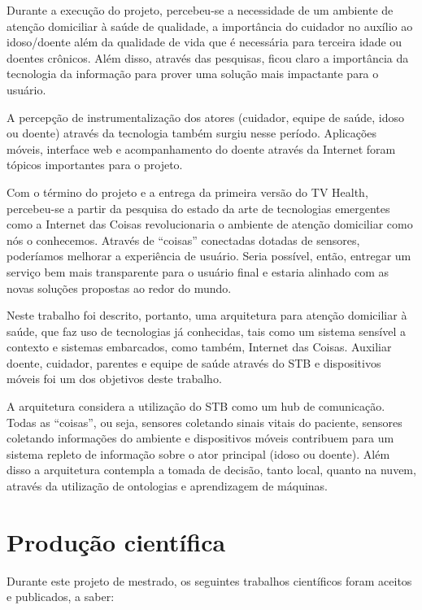 Durante a execução do projeto, percebeu-se a necessidade de um ambiente de
atenção domiciliar à saúde de qualidade, a importância do cuidador no auxílio
ao idoso/doente além da qualidade de vida que é necessária para terceira idade
ou doentes crônicos. Além disso, através das pesquisas, ficou claro a
importância da tecnologia da informação para prover uma solução mais impactante
para o usuário. 

A percepção de instrumentalização dos atores (cuidador, equipe de saúde, idoso
ou doente) através da tecnologia também surgiu nesse período. Aplicações
móveis, interface web e acompanhamento do doente através da Internet foram
tópicos importantes para o projeto.

Com o término do projeto \nextsaude[] e a entrega da primeira versão do TV Health,
percebeu-se a partir da pesquisa do estado da arte de tecnologias emergentes
como a Internet das Coisas revolucionaria o ambiente de atenção domiciliar como
nós o conhecemos. Através de ``coisas'' conectadas dotadas de sensores,
poderíamos melhorar a experiência de usuário. Seria possível, então, entregar
um serviço bem mais transparente para o usuário final e estaria alinhado com as
novas soluções propostas ao redor do mundo.

Neste trabalho foi descrito, portanto, uma arquitetura para atenção domiciliar
à saúde, que faz uso de tecnologias já conhecidas, tais como um sistema
sensível a contexto e sistemas embarcados, como também, Internet das Coisas.
Auxiliar doente, cuidador, parentes e equipe de saúde através do STB e
dispositivos móveis foi um dos objetivos deste trabalho. 

A arquitetura considera a utilização do STB como um hub de comunicação. Todas
as ``coisas'', ou seja, sensores coletando sinais vitais do paciente, sensores
coletando informações do ambiente e dispositivos móveis contribuem para um
sistema repleto de informação sobre o ator principal (idoso ou doente). Além
disso a arquitetura contempla a tomada de decisão, tanto local, quanto na
nuvem, através da utilização de ontologias e aprendizagem de máquinas.

\section{Produção científica}\label{sec:producao}  

Durante este projeto de mestrado, os seguintes trabalhos científicos foram
aceitos e publicados, a saber:

